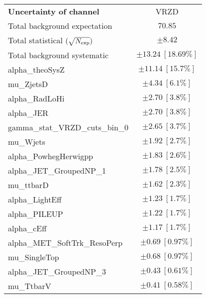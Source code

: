 
\begin{table}
\begin{center}
\setlength{\tabcolsep}{0.0pc}
\begin{tabular*}{\textwidth}{@{\extracolsep{\fill}}lc}
\noalign{\smallskip}\hline\noalign{\smallskip}
{\bf Uncertainty of channel}                                    & VRZD            \\
\noalign{\smallskip}\hline\noalign{\smallskip}
Total background expectation             &  $70.85$       \\
\noalign{\smallskip}\hline\noalign{\smallskip}
Total statistical $(\sqrt{N_{\rm exp}})$              & $\pm 8.42$       \\
Total background systematic               & $\pm 13.24\ [18.69\%] $             \\
\noalign{\smallskip}\hline\noalign{\smallskip}
\noalign{\smallskip}\hline\noalign{\smallskip}
alpha\_theoSysZ         & $\pm 11.14\ [15.7\%] $       \\
mu\_ZjetsD         & $\pm 4.34\ [6.1\%] $       \\
alpha\_RadLoHi         & $\pm 2.70\ [3.8\%] $       \\
alpha\_JER         & $\pm 2.70\ [3.8\%] $       \\
gamma\_stat\_VRZD\_cuts\_bin\_0         & $\pm 2.65\ [3.7\%] $       \\
mu\_Wjets         & $\pm 1.92\ [2.7\%] $       \\
alpha\_PowhegHerwigpp         & $\pm 1.83\ [2.6\%] $       \\
alpha\_JET\_GroupedNP\_1         & $\pm 1.78\ [2.5\%] $       \\
mu\_ttbarD         & $\pm 1.62\ [2.3\%] $       \\
alpha\_LightEff         & $\pm 1.23\ [1.7\%] $       \\
alpha\_PILEUP         & $\pm 1.22\ [1.7\%] $       \\
alpha\_cEff         & $\pm 1.17\ [1.7\%] $       \\
alpha\_MET\_SoftTrk\_ResoPerp         & $\pm 0.69\ [0.97\%] $       \\
mu\_SingleTop         & $\pm 0.68\ [0.97\%] $       \\
alpha\_JET\_GroupedNP\_3         & $\pm 0.43\ [0.61\%] $       \\
mu\_TtbarV         & $\pm 0.41\ [0.58\%] $       \\

\end{tabular*}
\end{center}
\end{table}
